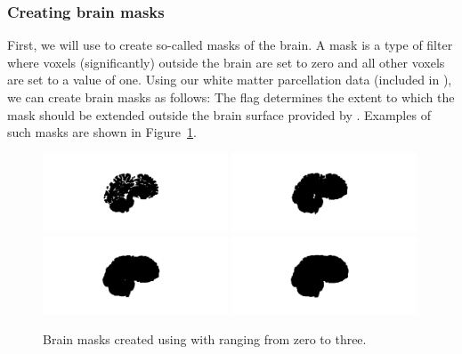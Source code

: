 \subsubsection*{Creating brain masks}
First, we will use \freesurfer{} to create so-called
masks of the brain. A mask is a type of filter where voxels (significantly) 
outside the brain are set to zero and all other voxels are set to a value of one.  
Using our white matter parcellation data (included in 
), we can create brain masks as follows:
\noindent The  flag determines the extent to which the mask should be extended 
outside the brain surface provided by
. Examples of such masks are shown in
Figure~\ref{fig:chp5:masks}.
\begin{figure}	
\begin{center}
  \includegraphics[trim=400 130 500 150,clip,width=0.49\textwidth]{./graphics/chp5/mask0.png}
\includegraphics[trim=400 130 500 150,clip,width=0.49\textwidth]{./graphics/chp5/mask1.png} \\
\includegraphics[trim=400 130 500 150,clip,width=0.49\textwidth]{./graphics/chp5/mask2.png}
\includegraphics[trim=400 130 500 150,clip,width=0.49\textwidth]{./graphics/chp5/mask3.png}
\end{center}
\caption{
  Brain masks created using  with  ranging from zero to three.
}
\label{fig:chp5:masks}
\end{figure}

